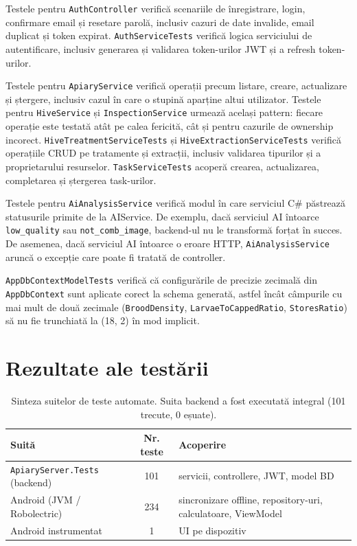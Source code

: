 Testele pentru \texttt{AuthController} verifică scenariile de înregistrare, login, confirmare email și resetare parolă, inclusiv cazuri de date invalide, email duplicat și token expirat. \texttt{AuthServiceTests} verifică logica serviciului de autentificare, inclusiv generarea și validarea token-urilor JWT și a refresh token-urilor.

Testele pentru \texttt{ApiaryService} verifică operații precum listare, creare, actualizare și ștergere, inclusiv cazul în care o stupină aparține altui utilizator. Testele pentru \texttt{HiveService} și \texttt{InspectionService} urmează același pattern: fiecare operație este testată atât pe calea fericită, cât și pentru cazurile de ownership incorect. \texttt{HiveTreatmentServiceTests} și \texttt{HiveExtractionServiceTests} verifică operațiile CRUD pe tratamente și extracții, inclusiv validarea tipurilor și a proprietarului resurselor. \texttt{TaskServiceTests} acoperă crearea, actualizarea, completarea și ștergerea task-urilor.

Testele pentru \texttt{AiAnalysisService} verifică modul în care serviciul C\# păstrează statusurile primite de la AIService. De exemplu, dacă serviciul AI întoarce \texttt{low\_quality} sau \texttt{not\_comb\_image}, backend-ul nu le transformă forțat în succes. De asemenea, dacă serviciul AI întoarce o eroare HTTP, \texttt{AiAnalysisService} aruncă o excepție care poate fi tratată de controller.

\texttt{AppDbContextModelTests} verifică că configurările de precizie zecimală din \texttt{AppDbContext} sunt aplicate corect la schema generată, astfel încât câmpurile cu mai mult de două zecimale (\texttt{BroodDensity}, \texttt{LarvaeToCappedRatio}, \texttt{StoresRatio}) să nu fie trunchiată la (18, 2) în mod implicit.

\section{Rezultate ale testării}

\begin{table}[H]
	\centering
	\begin{tabular}{l c p{4.7cm}}
		\hline
		\textbf{Suită} & \textbf{Nr. teste} & \textbf{Acoperire} \\
		\hline
		\texttt{ApiaryServer.Tests} (backend) & 101 & servicii, controllere, JWT, model BD \\
		Android (JVM / Robolectric) & 234 & sincronizare offline, repository-uri, calculatoare, ViewModel \\
		Android instrumentat & 1 & UI pe dispozitiv \\
		\hline
	\end{tabular}
	\caption{Sinteza suitelor de teste automate. Suita backend a fost executată integral (101 trecute, 0 eșuate).}
	\label{tab:teste-automate}
\end{table}

